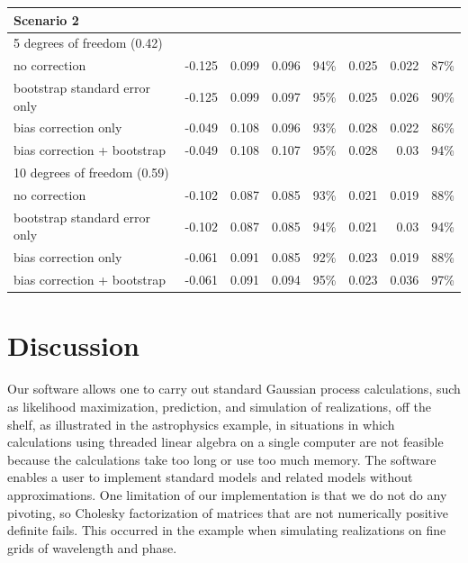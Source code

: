 \documentclass[12pt]{article}
\begin{document}
\begin{table}
\begin{tabular}{lrrrrrrr}
\hline
\noalign {\vspace{0.05cm}}
\textrm{Scenario }2\\
\hline
\noalign {\vspace{0.05cm}}
\textrm{5 degrees of freedom }(0.42)\\
\noalign {\vspace{0.05cm}}
\quad \textrm{no correction}&-0.125&0.099&0.096&94\%&0.025&0.022&87\%\\
\quad \textrm{bootstrap standard error only}&-0.125&0.099&0.097&95\%&0.025&0.026&90\%\\
\quad \textrm{bias correction only}&-0.049&0.108&0.096&93\%&0.028&0.022&86\%\\
\quad \textrm{bias correction + bootstrap}&-0.049&0.108&0.107&95\%&0.028&0.03&94\%\\
\noalign {\vspace{0.05cm}}
\textrm{10 degrees of freedom }(0.59)\\
\noalign {\vspace{0.05cm}}
\quad \textrm{no correction}&-0.102&0.087&0.085&93\%&0.021&0.019&88\%\\
\quad \textrm{bootstrap standard error only}&-0.102&0.087&0.085&94\%&0.021&0.03&94\%\\
\quad \textrm{bias correction only}&-0.061&0.091&0.085&92\%&0.023&0.019&88\%\\
\quad \textrm{bias correction + bootstrap}&-0.061&0.091&0.094&95\%&0.023&0.036&97\%\\
\end{tabular}

\label{tab:linear.sim}
\end{table}

\section{Discussion}

Our software allows one to carry out standard Gaussian process calculations, such as likelihood maximization, prediction, and simulation of realizations, off the shelf, as illustrated in the astrophysics example, in situations in which calculations using threaded linear algebra on a single computer are not feasible because the calculations take too long or use too much memory.  The software enables a user to implement standard models and related models without approximations. One limitation of our implementation is that we do not do any pivoting, so Cholesky factorization of matrices that are not numerically positive definite fails. This occurred in the example when simulating realizations on fine grids of wavelength and phase. 
\end{document}
